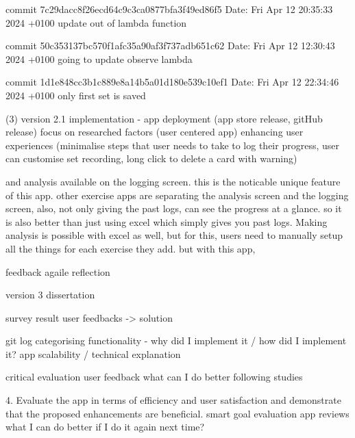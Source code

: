 commit 7c29dacc8f26ecd64c9c3ca0877bfa3f49ed86f5
Date:   Fri Apr 12 20:35:33 2024 +0100
    update out of lambda function

commit 50c353137bc570f1afc35a90af3f737adb651c62
Date:   Fri Apr 12 12:30:43 2024 +0100
    going to update observe lambda


commit 1d1e848cc3b1c889e8a14b5a01d180e539c10ef1
Date:   Fri Apr 12 22:34:46 2024 +0100
    only first set is saved


(3) version 2.1 implementation - app deployment (app store release, gitHub release)
focus on researched factors (user centered app)
enhancing user experiences
(minimalise steps that user needs to take to log their progress, user can customise set recording, long click to delete a card with warning)


and analysis available on the logging screen. 
this is the noticable unique feature of this app. 
other exercise apps are separating the analysis screen and the logging screen, 
also, not only giving the past logs, can see the progress at a glance. 
so it is also better than just using excel which simply gives you past logs.
Making analysis is possible with excel as well, but for this, users need to manually setup all the things for each exercise they add.
but with this app, 



feedback agaile reflection


version 3 dissertation

survey result
user feedbacks -> solution


git log categorising
functionality - why did I implement it / how did I implement it?
app scalability / technical explanation



critical evaluation
user feedback
what can I do better
following studies

4. Evaluate the app in terms of efficiency and user satisfaction and demonstrate that the proposed enhancements are beneficial.
	smart goal evaluation
	app reviews
	what I can do better if I do it again next time?